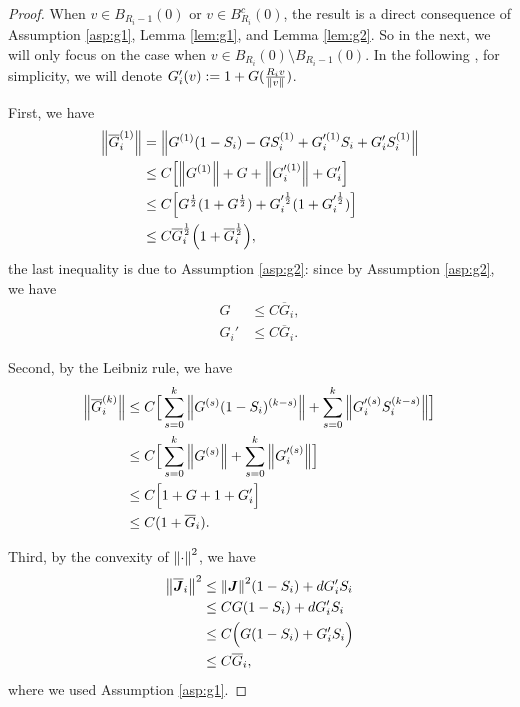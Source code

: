 \documentclass[a4paper, 11pt]{article}
\theoremstyle{plain}
\theoremstyle{remark}
\theoremstyle{definition}
\newcommand{\J}{\boldsymbol{J}}
\begin{document}
		\begin{proof}
			When $v\in B_{R_i-1}(0)$ or $v\in B^c_{R_i}(0)$, the result is a direct consequence of Assumption \ref{asp:g1}, Lemma \ref{lem:g1}, and Lemma \ref{lem:g2}.  So in the next, we will only focus on the case when $v\in B_{R_i}(0)\setminus B_{R_i-1}(0)$.
			In the following , for simplicity, we will denote $G_i'(v):=1+G(\frac{R_iv}{\norm{v}})$.
			
			First, we have
			\begin{equation}
				\begin{aligned}
					\norm{\overline{G}_i^{(1)}}&=\norm{G^{(1)}(1-S_i)-GS_i^{(1)}+G_i'^{(1)}S_i+G_i'S_i^{(1)}}\\
					&\leq C\Big[\norm{G^{(1)}}+G+\norm{G_i'^{(1)}}+G_i'\Big]\\
					&\leq C\Big[G^{\frac{1}{2}}(1+G^{\frac{1}{2}})+G_i'^{\frac{1}{2}}(1+G_i'^{\frac{1}{2}})\Big]\\
					&\leq C\overline{G}^{\frac{1}{2}}_i\Big(1+\overline{G}^{\frac{1}{2}}_i\Big),
				\end{aligned}
			\end{equation}
			the last inequality is due to Assumption \ref{asp:g2}: since by Assumption \ref{asp:g2}, we have 
			\begin{eqnarray}
				G&\leq C\overline{G}_i,\\
				G_i'&\leq C\overline{G}_i.
			\end{eqnarray}
			
			Second, by the Leibniz rule, we have
			\begin{equation}
				\begin{aligned}
					\norm{\overline{G}_i^{(k)}}&\leq C\Big[\sum_{s=0}^k\norm{{G}^{(s)}(1-S_i)^{(k-s)}}+\sum_{s=0}^k\norm{G_i'^{(s)}S_i^{(k-s)}}\Big]\\
					&\leq C\Big[\sum_{s=0}^k\norm{{G}^{(s)}}+\sum_{s=0}^k\norm{G_i'^{(s)}}\Big]\\
					&\leq C\Big[1+G+1+G_i'\Big]\\
					&\leq C(1+\overline{G}_i).
				\end{aligned}
			\end{equation}
			
			Third, by the convexity of $\norm{\cdot}^2$, we have
			\begin{equation}
				\begin{aligned}
					\norm{\overline{\J}_i}^2&\leq \norm{\J}^2(1-S_i)+dG_i'S_i\\
					&\leq CG(1-S_i)+dG_i'S_i\\
					&\leq C\Big(G(1-S_i)+G_i'S_i\Big)\\
					&\leq C\overline{G}_i,
				\end{aligned}
			\end{equation}
			where we used Assumption \ref{asp:g1}.
			

\end{proof}
\end{document}
